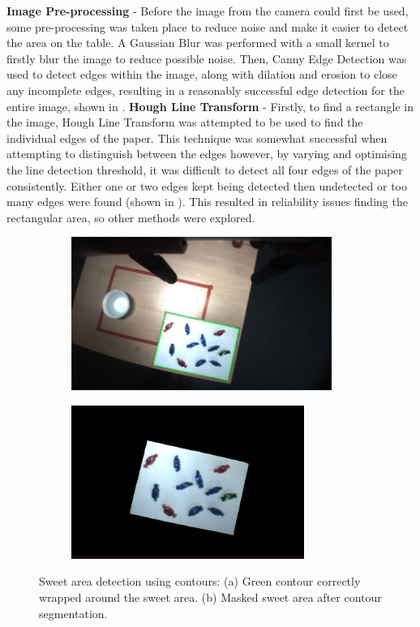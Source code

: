 \textbf{Image Pre-processing} - 
Before the image from the camera could first be used, some pre-processing was taken place to reduce noise and make it easier to detect the area on the table. A Gaussian Blur was performed with a small kernel to firstly blur the image to reduce possible noise. Then, Canny Edge Detection was used to detect edges within the image, along with dilation and erosion to close any incomplete edges, resulting in a reasonably successful edge detection for the entire image, shown in \textbf{}.
\newline\newline
\textbf{Hough Line Transform} - 
Firstly, to find a rectangle in the image, Hough Line Transform was attempted to be used to find the individual edges of the paper. This technique was somewhat successful when attempting to distinguish between the edges however, by varying and optimising the line detection threshold, it was difficult to detect all four edges of the paper consistently. Either one or two edges kept being detected then undetected or too many edges were found (shown in \textbf{}). This resulted in reliability issues finding the rectangular area, so other methods were explored.
\begin{figure}[H]
    \captionsetup[subfigure]{justification=centering}
    \begin{subfigure}[H]{0.475\textwidth}   
        \centering 
        \caption{}
        \includegraphics[width=\textwidth, height=5cm]{contourfound.jpg}
        \label{fig:greencontour}
    \end{subfigure}
    \begin{subfigure}[H]{0.475\textwidth}   
        \centering 
        \caption{}
        \includegraphics[width=\textwidth, height=5cm]{segmentedarea.png}
        \label{fig:sweetareamask}
    \end{subfigure}
    \vspace{-0.3cm}
    \caption{Sweet area detection using contours: (a) Green contour correctly wrapped around the sweet area. (b) Masked sweet area after contour segmentation.}
\end{figure}

